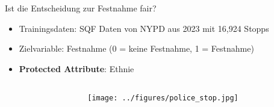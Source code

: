 \documentclass[aspectratio=169]{beamer}
\begin{document}
\begin{frame}{Ist die Entscheidung zur Festnahme fair?}
    \begin{itemize}
        \item Trainingsdaten: SQF Daten von NYPD aus 2023 mit 16,924 Stopps
        \item Zielvariable: Festnahme \cite{Badr2022DTFANSP} (0 = keine Festnahme, 1 = Festnahme) 
        \item \textbf{Protected Attribute}: Ethnie
    \end{itemize}

    \vspace{0.5cm} %

    \begin{columns}[c] %
        \begin{column}{0.5\textwidth}
            \centering
        \end{column}

        \begin{column}{0.5\textwidth}
            \centering
            \texttt{[image: ../figures/police\_stop.jpg]}
        \end{column}
    \end{columns}
\end{frame}
\end{document}
